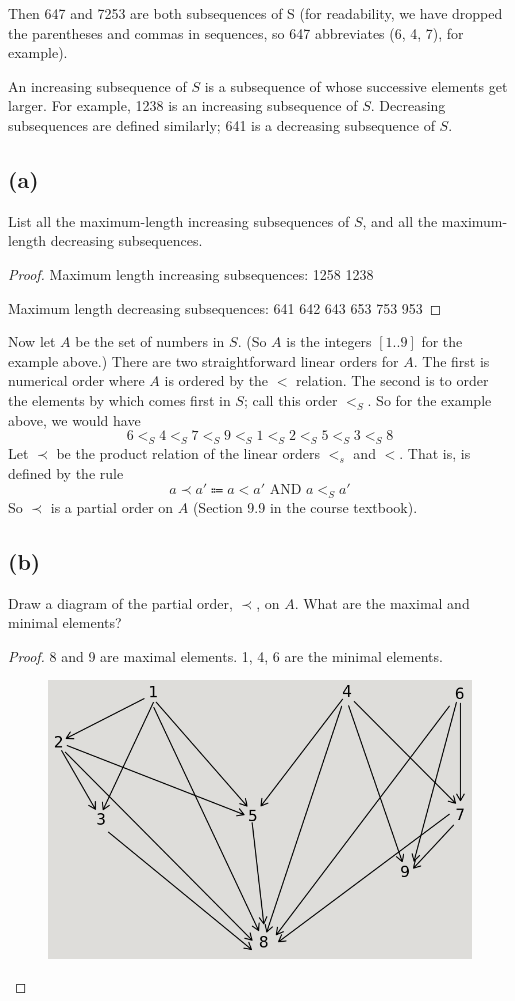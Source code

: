 \documentclass[14pt]{extarticle}
\begin{document}
Then 647 and 7253 are both subsequences of S (for readability, we have dropped the parentheses and commas in sequences, so 647 abbreviates (6, 4, 7), for example).

An increasing subsequence of $S$ is a subsequence of whose successive elements get larger. For example, 1238 is an increasing subsequence of $S$. Decreasing subsequences are defined similarly; 641 is a decreasing subsequence of $S$.

\subsection{(a)}
List all the maximum-length increasing subsequences of $S$, and all the maximum-length decreasing subsequences.
\begin{proof}
Maximum length increasing subsequences: 1258 1238

Maximum length decreasing subsequences: 641 642 643 653 753 953
\end{proof}

Now let $A$ be the set of numbers in $S$. (So $A$ is the integers $[1..9]$ for the example above.) There are two straightforward linear orders for $A$. The first is numerical order where $A$ is ordered by the $<$ relation. The second is to order the elements by which comes first in $S$; call this order $<_S$. So for the example above, we would have 
$$
6 <_S 4 <_S 7 <_S 9 <_S 1 <_S 2 <_S 5 <_S 3 <_S 8
$$
Let $\prec$ be the product relation of the linear orders $<_s$ and $<$. That is, is defined by the rule
$$
a \prec a' \Coloneqq a < a' \text{ AND } a <_S a'
$$
So $\prec$ is a partial order on $A$ (Section 9.9 in the course textbook).

\subsection{(b)}
Draw a diagram of the partial order, $\prec$, on $A$. What are the maximal and minimal elements?
\begin{proof}
8 and 9 are maximal elements. 1, 4, 6 are the minimal elements.
\begin{figure}[ht!]
\centering
\includegraphics[scale=0.5]{partial-order.png}
\end{figure}
\end{proof}
\end{document}
